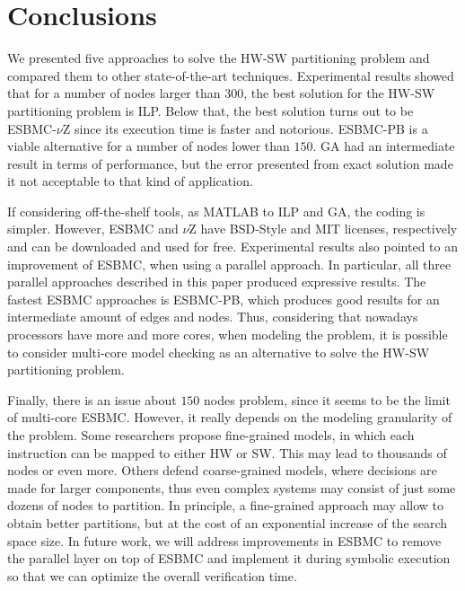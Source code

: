 \documentclass{doublecol-new}
\theoremstyle{TH}{
\newtheorem{lemma}{Lemma}
\newtheorem{theorem}[lemma]{Theorem}
\newtheorem{corrolary}[lemma]{Corrolary}
\newtheorem{conjecture}[lemma]{Conjecture}
\newtheorem{proposition}[lemma]{Proposition}
\newtheorem{claim}[lemma]{Claim}
\newtheorem{stheorem}[lemma]{Wrong Theorem}
\newtheorem{algorithm}{Algorithm}
}
\theoremstyle{THrm}{
\newtheorem{definition}{Definition}[section]
\newtheorem{question}{Question}[section]
\newtheorem{remark}{Remark}
\newtheorem{scheme}{Scheme}
}
\theoremstyle{THhit}{
\newtheorem{case}{Case}[section]
}
\begin{document}
\vspace {-4 mm}
\section{Conclusions}
\label{Conclusions}

We presented five approaches to solve the HW-SW partitioning problem and compared them to other state-of-the-art techniques. Experimental results showed that for a number of nodes larger than $300$, the best solution for the HW-SW partitioning problem is ILP. Below that, the best solution turns out to be ESBMC-$\nu$Z since its execution time is faster and notorious. ESBMC-PB is a viable alternative for a number of nodes lower than $150$. GA had an intermediate result in terms of performance, but the error presented from exact solution made it not acceptable to that kind of application. 

If considering off-the-shelf tools, as MATLAB to ILP and GA, the coding is simpler. However, ESBMC and $\nu$Z have BSD-Style and MIT licenses, respectively and can be downloaded and used for free. Experimental results also pointed to an improvement of ESBMC, when using a parallel approach. In particular, all three parallel approaches described in this paper produced expressive results. The fastest ESBMC approaches is ESBMC-PB, which produces good results for an intermediate amount of edges and nodes. Thus, considering that nowadays processors have more and more cores, when modeling the problem, it is possible to consider multi-core model checking as an alternative to solve the HW-SW partitioning problem. 

Finally, there is an issue about $150$ nodes problem, since it seems to be the limit of multi-core ESBMC. However, it really depends on the modeling granularity of the problem. Some researchers propose fine-grained models, in which each instruction can be mapped to either HW or SW. This may lead to thousands of nodes or even more. Others defend coarse-grained models, where decisions are made for larger components, thus even complex systems may consist of just some dozens of nodes to partition. In principle, a fine-grained approach may allow to obtain better partitions, but at the cost of an exponential increase of the search space size. In future work, we will address improvements in ESBMC to remove the parallel layer on top of ESBMC and implement it during symbolic execution so that we can optimize the overall verification time.
\end{document}
